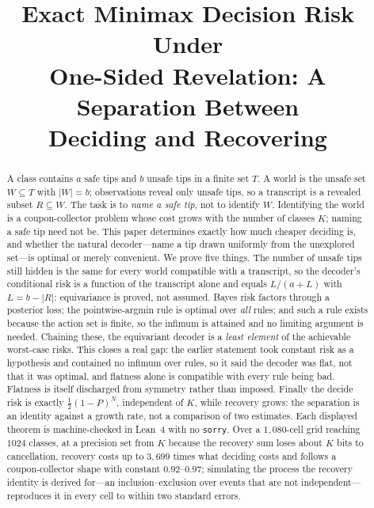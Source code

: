 



\title{Exact Minimax Decision Risk Under\\
One-Sided Revelation: A Separation Between\\
Deciding and Recovering}

\author{
}

\maketitle

\begin{abstract}
A class contains $a$ safe tips and $b$ unsafe tips in a finite set $T$. A world is the unsafe
set $W\subseteq T$ with $|W|=b$; observations reveal only unsafe tips, so a transcript is a
revealed subset $R\subseteq W$. The task is to \emph{name a safe tip}, not to identify $W$.
Identifying the world is a coupon-collector problem whose cost grows with the number of
classes $K$; naming a safe tip need not be. This paper determines exactly how much cheaper
deciding is, and whether the natural decoder---name a tip drawn uniformly from the unexplored
set---is optimal or merely convenient. We prove five things. The number of unsafe tips still
hidden is the same for every world compatible with a transcript, so the decoder's conditional
risk is a function of the transcript alone and equals $L/(a+L)$ with $L=b-|R|$: equivariance
is proved, not assumed. Bayes risk factors through a posterior loss; the pointwise-argmin rule
is optimal over \emph{all} rules; and such a rule exists because the action set is finite, so
the infimum is attained and no limiting argument is needed. Chaining these, the equivariant
decoder is a \emph{least element} of the achievable worst-case risks. This closes a real gap:
the earlier statement took constant risk as a hypothesis and contained no infimum over rules,
so it said the decoder was flat, not that it was optimal, and flatness alone is compatible
with every rule being bad. Flatness is itself discharged from symmetry rather than imposed.
Finally the decide risk is exactly $\tfrac12(1-P)^{N}$, independent of $K$, while recovery
grows: the separation is an identity against a growth rate, not a comparison of two
estimates. Each displayed theorem is machine-checked in Lean~4 with no \texttt{sorry}. Over a
$1{,}080$-cell grid reaching $1024$ classes, at a precision set from $K$ because the recovery
sum loses about $K$ bits to cancellation, recovery costs up to $3{,}699$ times what deciding
costs and follows a coupon-collector shape with constant $0.92$--$0.97$; simulating the process the
recovery identity is derived for---an inclusion--exclusion over events that are not
independent---reproduces it in every cell to within two standard errors.
\end{abstract}

